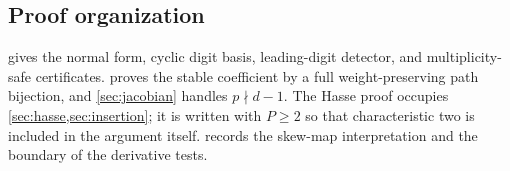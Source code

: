 \subsection{Proof organization}

 gives the normal form, cyclic digit basis,
leading-digit detector, and multiplicity-safe certificates.
 proves the stable coefficient by a full
weight-preserving path bijection, and \cref{sec:jacobian} handles
$p\nmid d-1$. The Hasse proof occupies
\cref{sec:hasse,sec:insertion}; it is written with $P\ge2$ so that
characteristic two is included in the argument itself.
 records the skew-map interpretation and
the boundary of the derivative tests.
